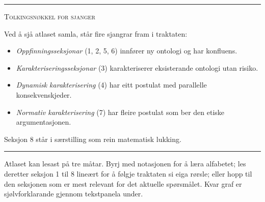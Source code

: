 \documentclass[a4paper,11pt]{article}
\begin{document}
\hrule

\vspace{1em}

{\scshape Tolkingsnøkkel for sjanger}

Ved å sjå atlaset samla, står fire sjangrar fram i traktaten:

\begin{itemize}[leftmargin=*,itemsep=0.2em]
\item \emph{Oppfinningsseksjonar} (1, 2, 5, 6) innfører ny ontologi og har konfluens.
\item \emph{Karakteriseringsseksjonar} (3) karakteriserer eksisterande ontologi utan risiko.
\item \emph{Dynamisk karakterisering} (4) har eitt postulat med parallelle konsekvenskjeder.
\item \emph{Normativ karakterisering} (7) har fleire postulat som ber den etiske argumentasjonen.
\end{itemize}

Seksjon 8 står i særstilling som rein matematisk lukking.

\vspace{0.6em}

\hrule

\vspace{0.6em}

Atlaset kan lesast på tre måtar. Byrj med notasjonen for å læra alfabetet; les deretter seksjon 1 til 8 lineært for å følgje traktaten si eiga rørsle; eller hopp til den seksjonen som er mest relevant for det aktuelle spørsmålet. Kvar graf er sjølvforklarande gjennom tekstpanela under.
\end{document}
